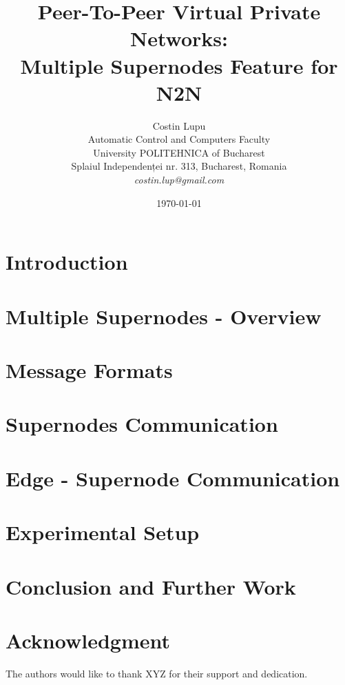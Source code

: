 \documentclass[12pt]{article}
\title{Peer-To-Peer Virtual Private Networks:\\
Multiple Supernodes Feature for N2N}
\author{Costin Lupu\\
Automatic Control and Computers Faculty\\
University POLITEHNICA of Bucharest\\
Splaiul Independenței nr. 313, Bucharest, Romania \\
\emph{costin.lup@gmail.com}}
\date{\today}
\begin{document}
\maketitle

\begin{abstract}

\end{abstract}

\section{Introduction}
\label{sec:introduction}


\section{Multiple Supernodes - Overview}
\label{sec:multiple-supernodes}


\section{Message Formats}
\label{sec:message-formats}


\section{Supernodes Communication}
\label{sec:supernodes-communication}


\section{Edge - Supernode Communication}
\label{sec:edge-supernode-communication}


\section{Experimental Setup}
\label{sec:setup}


\section{Conclusion and Further Work}
\label{sec:conclusion}


\section*{Acknowledgment}
\label{sec:acknowledgment}

The authors would like to thank XYZ for their support and dedication.



\end{document}

